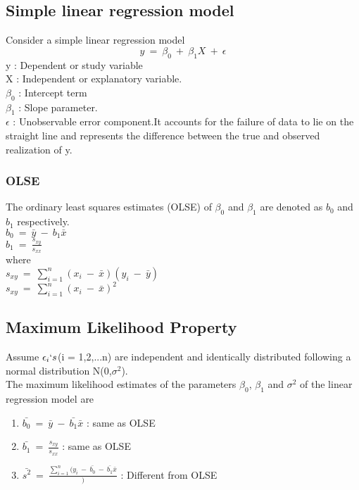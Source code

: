 \subsection*{Simple linear regression model}
Consider a simple linear regression model
\[ y\ =\ \beta_0\ +\ \beta_1X\ +\ \epsilon \]
y : Dependent or study variable\\
X : Independent or explanatory variable.\\
$\beta_0$ : Intercept term\\
$\beta_1$ : Slope parameter.\\
$\epsilon$ : Unobservable error component.It accounts for the failure of data to lie on the straight line and represents the difference between the true and observed realization of y.
\subsubsection*{OLSE}
The ordinary least squares estimates (OLSE) of $\beta_0$ and $\beta_1$ are denoted as $b_0$ and $b_1$ respectively.\\
$b_0\ =\ \bar{y}\ -\ b_1\bar{x}$\\
$b_1\ =\ \frac{s_{xy}}{s_{xx}}$\\
where\\
$s_{xy}\ =\ \sum_{i=1}^{n}(x_i\ -\ \bar{x})(y_i\ -\ \bar{y})$\\
$s_{xy}\ =\ \sum_{i=1}^{n}(x_i\ -\ \bar{x})^2$

\subsection*{Maximum Likelihood Property}
Assume $\epsilon_i`s$(i = 1,2,...n) are independent and identically distributed following a normal distribution N(0,$\sigma^2$).\\
The maximum likelihood estimates of the parameters $\beta_0$, $\beta_1$ and $\sigma^2$ of the linear regression model are
\begin{enumerate}
    \item $\bar{b_0}\ =\ \bar{y}\ -\ \bar{b_1}\bar{x}$ : same as OLSE
    \item $\bar{b_1}\ =\ \frac{s_{xy}}{s_{xx}}$ : same as OLSE
    \item $\bar{s^2}\ =\ \frac{\sum_{i=1}^{n}(y_i\ -\ \bar{b_0}\ -\ \bar{b_1}\bar{x}})$ : Different from OLSE
\end{enumerate}

